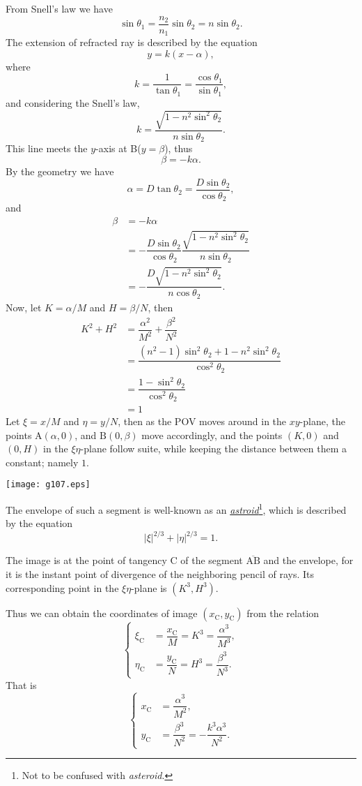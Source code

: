 \documentclass[twocolumn]{article}
\begin{document}
From Snell's law we have
$$ \sin\theta_1 = \frac{n_2}{n_1} \sin\theta_2 = n\sin\theta_2.$$
The extension of refracted ray is described by the equation 
$$y=k(x-\alpha),$$
where 
$$k=\dfrac{1}{\tan\theta_1}=\dfrac{\cos\theta_1}{\sin\theta_1},$$
and considering the Snell's law,
$$k=\dfrac{\sqrt{1-n^2\sin^2\theta_2}}{n\sin\theta_2}.$$
This line meets the $y$-axis at B($y=\beta$), thus
$$\beta = -k\alpha.$$
By the geometry we have
$$\alpha = D\tan\theta_2 = \dfrac{D\sin\theta_2}{\cos\theta_2},$$
and
$$\begin{aligned}
	\beta &= -k\alpha \\
	&= -\dfrac{D\sin\theta_2}{\cos\theta_2}
	\dfrac{\sqrt{1-n^2\sin^2\theta_2}}{n\sin\theta_2}\\
	&=-\dfrac{D\sqrt{1-n^2\sin^2\theta_2}}{n\cos\theta_2}.
\end{aligned}$$
Now, let $K=\alpha/M$ and $H=\beta/N$, then
$$ \begin{aligned}
	K^2 + H^2 &= \dfrac{\alpha^2}{M^2}+\dfrac{\beta^2}{N^2}\\
	&=\dfrac{\left(n^2-1\right)\sin^2\theta_2 + 1-n^2\sin^2\theta_2}
	{\cos^2\theta_2}\\
	&=\dfrac{1-\sin^2\theta_2}{\cos^2\theta_2}\\
	&=1
\end{aligned}$$
Let $\xi=x/M$ and $\eta=y/N$, then as the POV moves around in the $xy$-plane,
the points $\mathrm{A}(\alpha, 0)$, and $\mathrm{B}(0, \beta)$ move accordingly,  
and the points $(K, 0)$ and $(0, H)$ in the $\xi\eta$-plane follow suite, 
while keeping the distance between them a constant; namely $1$.

\texttt{[image: g107.eps]}

The envelope of such a segment is well-known as an \href{https://en.wikipedia.org/wiki/Astroid}{\emph{astroid}}\footnote{Not 
to be confused with {\emph{asteroid}}.}, which is described by the 
equation
$$ \left| \xi \right|^{2/3} + \left| \eta \right|^{2/3} = 1. $$

The image is at the point of tangency $\mathrm{C}$ of the segment 
$\overline{\mathrm{AB}}$ and the envelope, for 
it is the instant point of divergence of the neighboring pencil of rays.
Its corresponding point in the $\xi\eta$-plane is $(K^3, H^3)$.

Thus we can obtain the coordinates of image $(x_{\mathrm{C}}^{}, y_{\mathrm{C}}^{})$ 
from the relation
$$ \left\{ 
\begin{aligned}
	\xi_{\mathrm{C}}^{} &= \dfrac{x_{\mathrm{C}}^{}}{M} = K^3 = \dfrac{\alpha^3}{M^3},\\
	\eta_{\mathrm{C}}^{} &= \dfrac{y_{\mathrm{C}}^{}}{N} = H^3 = \dfrac{\beta^3}{N^3}.
\end{aligned}
\right.$$
That is
$$ \left\{ 
\begin{aligned}
	x_{\mathrm{C}}^{} &= \dfrac{\alpha^3}{M^2},\\
	y_{\mathrm{C}}^{} &= \dfrac{\beta^3}{N^2}=-\dfrac{k^3\alpha^3}{N^2}.
\end{aligned}
\right.$$
\end{document}
